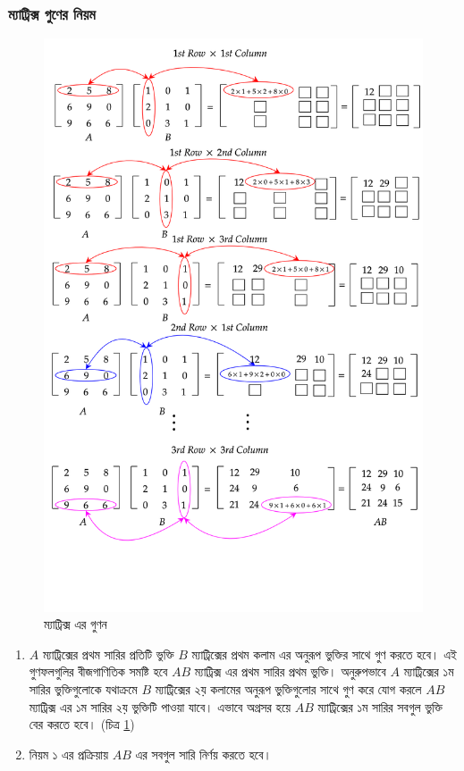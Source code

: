 \subsubsection{ম্যাট্রিক্স গুণের নিয়ম}
\begin{figure}
	\centering
	\includegraphics[scale=0.31]{images/matrix-mul.png}
	\caption{ম্যাট্রিক্স এর গুণন}
	\label{fig:matrix_mul}
\end{figure}
\begin{enumerate}
	\item $A$ ম্যাট্রিক্সের প্রথম সারির প্রতিটি ভুক্তি $B$ ম্যাট্রিক্সের প্রথম কলাম এর অনুরূপ ভুক্তির সাথে গুণ করতে হবে। এই গুণফলগুলির বীজগাণিতিক সমষ্টি হবে $AB$ ম্যাট্রিক্স এর প্রথম সারির প্রথম ভুক্তি। অনুরুপভাবে $A$ ম্যাট্রিক্সের ১ম সারির ভুক্তিগুলোকে যথাক্রমে $B$ ম্যাট্রিক্সের ২য় কলামের অনুরূপ ভুক্তিগুলোর সাথে গুণ করে যোগ করলে $AB$ ম্যাট্রিক্স এর ১ম সারির ২য় ভুক্তিটি পাওয়া যাবে। এভাবে অগ্রসর হয়ে $AB$ ম্যাট্রিক্সের ১ম সারির সবগুল ভুক্তি বের করতে হবে। (চিত্র \ref{fig:matrix_mul})
	\item নিয়ম ১ এর প্রক্রিয়ায় $AB$ এর সবগুল সারি নির্ণয় করতে হবে।	
\end{enumerate}
